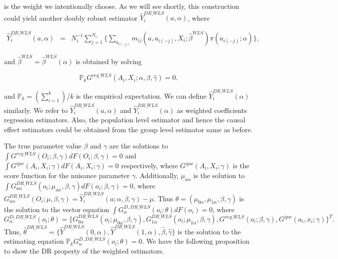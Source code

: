 \documentclass[oupdraft]{bio}
\begin{document}
\noindent is the weight we intentionally choose. As we will see shortly, this construction could yield another doubly robust estimator $\widehat{Y}_i^{DR\_WLS}(a,\alpha)$, where

\vspace{-0.8cm}
\begin{eqnarray*}\label{eq: DR_WLS_estimator}
  \widehat{Y}_i^{DR\_WLS}(a,\alpha)&=&N_i^{-1}\sum_{j=1}^{N_i}\Biggl\{\sum_{a_{i(-j)}}m_{ij}(a,a_{i(-j)},X_i;\hat\beta^{WLS})\pi(a_{i(-j)};\alpha)
 \Biggr\},
 \end{eqnarray*}

\noindent and $\hat\beta^{WLS}=\hat\beta^{WLS}(\alpha)$ is obtained by solving 

\begin{equation}\label{eq: ee_DR_WLS}
\mathds{P}_kG^{reg\_WLS}(A_i,X_i;\alpha,\beta,\hat\gamma)=0.
\end{equation}

\noindent and $\mathds{P}_k=(\sum_{i=1}^k)/k$ is the empirical expectation. We can define $\widehat{Y}_i^{DR\_WLS}(\alpha)$ similarly. We refer to $\widehat{Y}_i^{DR\_WLS}(a,\alpha)$ and $\widehat{Y}_i^{DR\_WLS}(\alpha)$ as weighted coefficients regression estimators. Also, the population level estimator and hence the causal effect estimators could be obtained from the group level estimator same as before. 


The true parameter value $\beta$ and $\gamma$ are the solutions to $\int G^{reg\_WLS}(O_i;\beta,\gamma)dF(O_i;\beta,\gamma)=0$ and $\int G^{ipw}(A_i,X_i;\gamma)dF(A_i,X_i;\gamma)=0$ respectively, where  $G^{ipw}(A_i,X_i;\gamma)$ is the score function for the nuisance parameter $\gamma$. Additionally, $\mu_{a\alpha}$ is the solution to $\int G^{DR\_WLS}_{a\alpha}(o_i;\mu_{a\alpha},\beta,\gamma) dF(o_i;\beta,\gamma) = 0$, where $G^{DR\_WLS}_{a\alpha}(O_i;\mu,\beta,\gamma) =\widehat{Y}_i^{DR\_WLS}(a;\alpha,\beta,\gamma)- \mu$.  Thus $\theta=(\mu_{0\alpha},\mu_{1\alpha},\beta,\gamma)$ is the solution to the vector equation $\int G^{ D, DR\_WLS}_{\alpha}(o_i;\theta) dF(o_i) = 0$, where $$G^{ D,DR\_WLS}_{\alpha}(o_i;\theta) = \{G^{DR\_WLS}_{0\alpha}(o_i;\mu_{0\alpha},\beta,\gamma),G^{DR\_WLS}_{1\alpha}(o_i;\mu_{1\alpha},\beta,\gamma),G^{reg\_WLS}(o_i;\beta,\gamma),G^{ipw}(a_i,x_i;\gamma)\}^T.$$ Thus, $\hat \theta^{DR\_WLS}=\{\hat Y^{DR\_WLS}(0,\alpha),\hat Y^{DR\_WLS}(1,\alpha),\hat\beta,\hat\gamma\}$ is the solution to the estimating equation $\mathds{P}_k G^{D,DR\_WLS}_{\alpha}(o_i;\theta)=0$. We have the following proposition to show the DR property of the weighted estimators.
\end{document}

